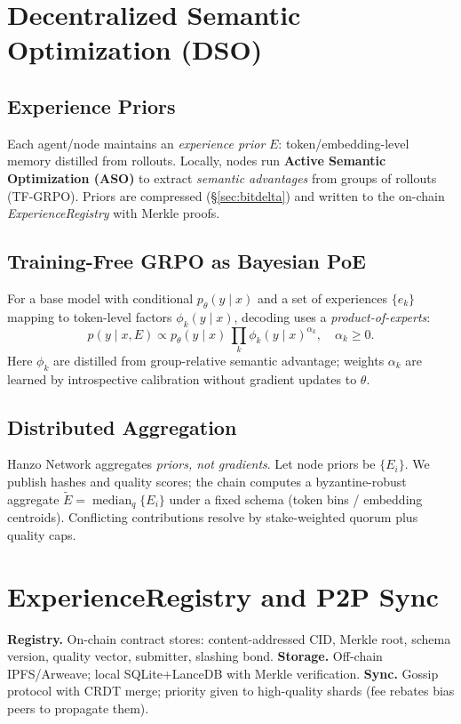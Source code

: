 \section{Decentralized Semantic Optimization (DSO)}
\subsection{Experience Priors}
Each agent/node maintains an \emph{experience prior} \(E\): token/embedding-level memory distilled from rollouts. Locally, nodes run \textbf{Active Semantic Optimization (ASO)} to extract \emph{semantic advantages} from groups of rollouts (TF-GRPO). Priors are compressed (\S\ref{sec:bitdelta}) and written to the on-chain \emph{ExperienceRegistry} with Merkle proofs.

\subsection{Training-Free GRPO as Bayesian PoE}
For a base model with conditional \(p_\theta(y\mid x)\) and a set of experiences \(\{e_k\}\) mapping to token-level factors \(\phi_k(y\mid x)\), decoding uses a \emph{product-of-experts}:
\begin{equation}\label{eq:poe}
 p(y\mid x,E) \propto p_\theta(y\mid x)\,\prod_{k} \phi_k(y\mid x)^{\alpha_k},\quad \alpha_k\ge 0.
\end{equation}
Here \(\phi_k\) are distilled from group-relative semantic advantage; weights \(\alpha_k\) are learned by introspective calibration without gradient updates to \(\theta\).

\subsection{Distributed Aggregation}
Hanzo Network aggregates \emph{priors, not gradients}. Let node priors be \(\{E_i\}\). We publish hashes and quality scores; the chain computes a byzantine-robust aggregate \(\tilde E = \operatorname{median}_q\{E_i\}\) under a fixed schema (token bins / embedding centroids). Conflicting contributions resolve by stake-weighted quorum plus quality caps.

\section{ExperienceRegistry and P2P Sync}
\textbf{Registry.} On-chain contract stores: content-addressed CID, Merkle root, schema version, quality vector, submitter, slashing bond. \textbf{Storage.} Off-chain IPFS/Arweave; local SQLite+LanceDB with Merkle verification. \textbf{Sync.} Gossip protocol with CRDT merge; priority given to high-quality shards (fee rebates bias peers to propagate them).
